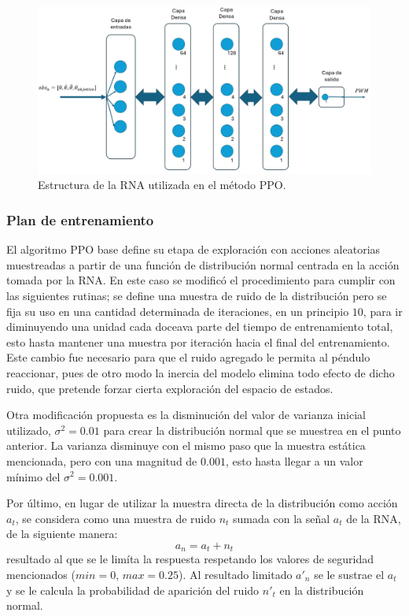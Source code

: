 \begin{figure}[hh]
	\centering
	\includegraphics[scale=0.4]{fig/new/RNAPPO.png}
	\caption{Estructura de la RNA utilizada en el método PPO.}
	\label{fig:RNAparaPPO}
\end{figure}


\subsubsection{Plan de entrenamiento}

El algoritmo PPO base define su etapa de exploración con acciones aleatorias muestreadas a partir de una función de distribución normal centrada en la acción tomada por la RNA. En este caso se modificó el procedimiento para cumplir con las siguientes rutinas; se define una muestra de ruido de la distribución pero se fija su uso en una cantidad determinada de iteraciones, en un principio $10$, para ir diminuyendo una unidad cada doceava parte del tiempo de entrenamiento total, esto hasta mantener una muestra por iteración hacia el final del entrenamiento. Este cambio fue necesario para que el ruido agregado le permita al péndulo reaccionar, pues de otro modo la inercia del modelo elimina todo efecto de dicho ruido, que pretende forzar cierta exploración del espacio de estados.

Otra modificación propuesta es la disminución del valor de varianza inicial utilizado, $\sigma^2 = 0.01$ para crear la distribución normal que se muestrea en el punto anterior. La varianza disminuye con el mismo paso que la muestra estática mencionada, pero con una magnitud de $0.001$, esto hasta llegar a un valor mínimo del  $\sigma^2 = 0.001$.

Por último, en lugar de utilizar la muestra directa de la distribución como acción $a_t$, se considera como una muestra de ruido $n_t$ sumada con la señal $a_t$ de la RNA, de la siguiente manera:
\begin{equation}
a_{n} = a_t + n_t
\end{equation}
resultado al que se le limíta la respuesta respetando los valores de seguridad mencionados ($min=0$, $max=0.25$). Al resultado limitado $a'_{n}$ se le sustrae el $a_t$ y se le calcula la probabilidad de aparición del ruido $n'_t$ en la  distribución normal.

